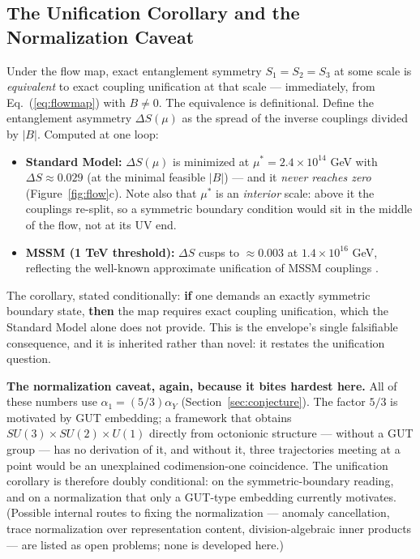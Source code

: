 \documentclass[11pt]{article}
\begin{document}
\subsection{The Unification Corollary and the Normalization Caveat}
\label{sec:corollary}

Under the flow map, exact entanglement symmetry $S_1 = S_2 = S_3$ at some scale is \emph{equivalent} to exact coupling unification at that scale --- immediately, from Eq.~(\ref{eq:flowmap}) with $B \ne 0$. The equivalence is definitional. Define the entanglement asymmetry $\Delta S(\mu)$ as the spread of the inverse couplings divided by $|B|$. Computed at one loop:

\begin{itemize}
\item \textbf{Standard Model:} $\Delta S(\mu)$ is minimized at $\mu^* = 2.4 \times 10^{14}$ GeV with $\Delta S \approx 0.029$ (at the minimal feasible $|B|$) --- and it \emph{never reaches zero} (Figure~\ref{fig:flow}c). Note also that $\mu^*$ is an \emph{interior} scale: above it the couplings re-split, so a symmetric boundary condition would sit in the middle of the flow, not at its UV end.
\item \textbf{MSSM (1 TeV threshold):} $\Delta S$ cusps to $\approx 0.003$ at $1.4 \times 10^{16}$ GeV, reflecting the well-known approximate unification of MSSM couplings \cite{amaldi}.
\end{itemize}

The corollary, stated conditionally: \textbf{if} one demands an exactly symmetric boundary state, \textbf{then} the map requires exact coupling unification, which the Standard Model alone does not provide. This is the envelope's single falsifiable consequence, and it is inherited rather than novel: it restates the unification question.

\textbf{The normalization caveat, again, because it bites hardest here.} All of these numbers use $\alpha_1 = (5/3)\alpha_Y$ (Section~\ref{sec:conjecture}). The factor $5/3$ is motivated by GUT embedding; a framework that obtains $SU(3) \times SU(2) \times U(1)$ directly from octonionic structure --- without a GUT group --- has no derivation of it, and without it, three trajectories meeting at a point would be an unexplained codimension-one coincidence. The unification corollary is therefore doubly conditional: on the symmetric-boundary reading, and on a normalization that only a GUT-type embedding currently motivates. (Possible internal routes to fixing the normalization --- anomaly cancellation, trace normalization over representation content, division-algebraic inner products --- are listed as open problems; none is developed here.)
\end{document}
